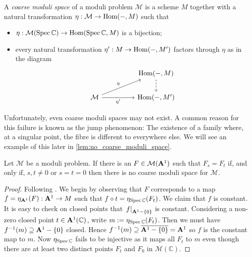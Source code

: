 \documentclass[12pt]{ociamthesis}  %
\begin{document}
\begin{definition}
  A \emph{coarse moduli space} of a moduli problem $\mathcal M$
  is a scheme $M$ together with a natural transformation
  $\eta : \mathcal M \to \operatorname{Hom}(-,M)$ such that
  \begin{itemize}
    \item $\eta : \mathcal M(\operatorname{Spec}\mathbb{C})\to \operatorname{Hom}(\operatorname{Spec}\mathbb{C},M)$ is a bijection;
    \item every natural transformation $\eta' : M \to \operatorname{Hom}(-,M')$ factors through
          $\eta$ as in the diagram
          \begin{equation*}
            \begin{tikzcd}
              && {\text{Hom}(-,M)} \\
              {\mathcal M} && {\text{Hom}(-,M')}
              \arrow[dashed, from=1-3, to=2-3]
              \arrow["\eta", from=2-1, to=1-3]
              \arrow["{\eta'}"', from=2-1, to=2-3]
            \end{tikzcd}
          \end{equation*}
  \end{itemize}
\end{definition}

Unfortunately, even coarse moduli spaces may not exist. A common reason
for this failure is known as the jump phenomenon: The existence of a family
where, at a singular point, the fibre is different to everywhere else.
We will see an example of this later in \ref{lem:no_coarse_moduli_space}.

\begin{lemma}\label{lem:no_coarse_condition}
  Let $\mathcal M$ be a moduli problem.  If there is an
  $F\in\mathcal M(\mathbf{A}^{1}_{})$ such that
  $F_s=F_t$ if, and only if,
  $s,t\neq 0$ or $s=t=0$ then there is no coarse moduli space
  for $\mathcal M$.
  \begin{proof}[Proof]
    Following \cite[Lemma 2.27]{hoskins2016}. We begin by observing that
    $F$ corresponds to a map $f=\eta_{\mathbf{A}^{1}_{}}(F):\mathbf{A}^{1}_{}\to M$
    such that $f\circ t =\eta_{\operatorname{Spec}\mathbb C}(F_t)$.
    We claim that $f$ is constant. It is easy to check on closed
    points that $\left.{f}\right\vert_{\mathbf{A}^{1}_{}-\{0\}}$ is constant.
    Considering a non-zero closed point $t \in \mathbf{A}^{1}_{}(\mathbb C)$,
    write $m := \eta_{\operatorname{Spec}\mathbb C}(F_t)$. Then
    we must have $f^{-1}(m)\supseteq\mathbf{A}^{1}_{}-\{0\}$ closed. Hence
    $f^{-1}(m)\supseteq\overline{\mathbf{A}^{1}_{}-\{0\}}=\mathbf{A}^{1}_{}$
    so $f$ is the constant map to $m$.
    Now $\eta_{\operatorname{Spec}\mathbb C}$ fails to be injective as it maps
    all $F_t$ to $m$ even though there are at least two distinct
    points $F_t$ and $F_0$ in $\mathcal M(\mathbb C)$.
  \end{proof}
\end{lemma}
\end{document}
